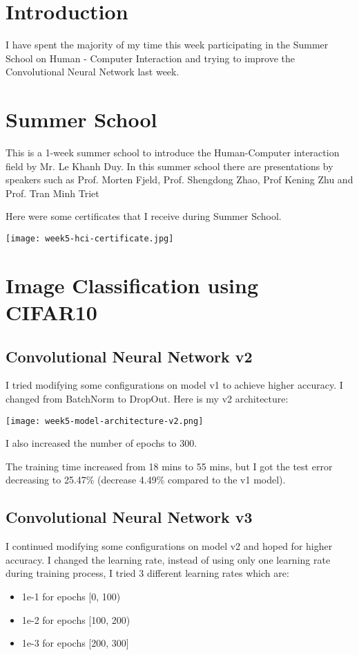 \section{Introduction}
I have spent the majority of my time this week participating in the Summer School on Human - Computer Interaction and trying to improve the Convolutional Neural Network last week.

\section{Summer School}
This is a 1-week summer school to introduce the Human-Computer interaction field by Mr. Le Khanh Duy. In this summer school there are presentations by speakers such as Prof. Morten Fjeld, Prof. Shengdong Zhao, Prof Kening Zhu and Prof. Tran Minh Triet

Here were some certificates that I receive during Summer School.

\begin{center}
\texttt{[image: week5-hci-certificate.jpg]}
\end{center}

\section{Image Classification using CIFAR10}
\subsection{Convolutional Neural Network v2}
I tried modifying some configurations on model v1 to achieve higher accuracy. I changed from BatchNorm\cite{batchnorm} to DropOut. Here is my v2 architecture:
\begin{center}
\texttt{[image: week5-model-architecture-v2.png]}
\end{center}

I also increased the number of epochs to 300.

The training time increased from 18 mins to 55 mins, but I got the test error decreasing to 25.47\% (decrease 4.49\% compared to the v1 model).

\subsection{Convolutional Neural Network v3}
I continued modifying some configurations on model v2 and hoped for higher accuracy. I changed the learning rate, instead of using only one learning rate during training process, I tried 3 different learning rates which are:
\begin{itemize}
\item 1e-1 for epochs [0, 100)
\item 1e-2 for epochs [100, 200)
\item 1e-3 for epochs [200, 300]
\end{itemize}

